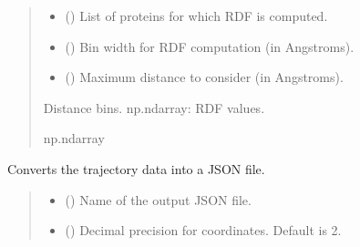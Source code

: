 \documentclass[letterpaper,10pt,english]{sphinxmanual}
\begin{document}
\begin{fulllineitems}
\begin{fulllineitems}
\begin{quote}
\begin{description}
\begin{itemize}
\item {} 
\sphinxAtStartPar
{} () \textendash{} List of proteins for which RDF is computed.

\item {} 
\sphinxAtStartPar
{} () \textendash{} Bin width for RDF computation (in Angstroms).

\item {} 
\sphinxAtStartPar
{} () \textendash{} Maximum distance to consider (in Angstroms).

\end{itemize}

\sphinxAtStartPar
Distance bins.
np.ndarray: RDF values.

\sphinxAtStartPar
np.ndarray

\end{description}\end{quote}

\end{fulllineitems}


\begin{fulllineitems}
\label{\detokenize{src:src.Analysis_Class.Analysis.convert_trajectory_to_json}}
\pysigstartsignatures
{}
\pysigstopsignatures
\sphinxAtStartPar
Converts the trajectory data into a JSON file.
\begin{quote}\begin{description}
\begin{itemize}
\item {} 
\sphinxAtStartPar
{} () \textendash{} Name of the output JSON file.

\item {} 
\sphinxAtStartPar
{} (\sphinxstyleliteralemphasis{\sphinxupquote{, }}) \textendash{} Decimal precision for coordinates. Default is 2.


\end{itemize}
\end{description}
\end{quote}
\end{fulllineitems}
\end{fulllineitems}
\end{document}
